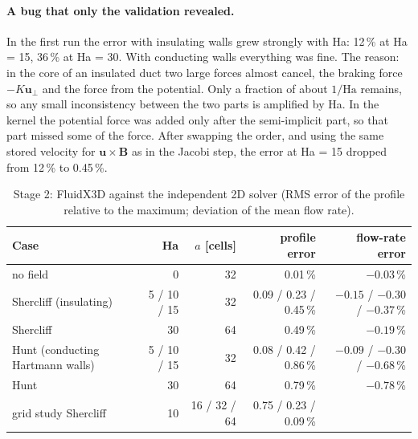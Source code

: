 \paragraph{A bug that only the validation revealed.} In the first run the error with insulating walls grew strongly
with Ha: 12\,\% at Ha = 15, 36\,\% at Ha = 30. With conducting walls everything was fine. The reason: in the core of
an insulated duct two large forces almost cancel, the braking force $-K\mathbf{u}_\perp$ and the force from the
potential. Only a fraction of about $1/\mathrm{Ha}$ remains, so any small inconsistency between the two parts is
amplified by Ha. In the kernel the potential force was added only after the semi-implicit part, so that part missed
some of the force. After swapping the order, and using the same stored velocity for $\mathbf{u}\times\mathbf{B}$ as in
the Jacobi step, the error at Ha = 15 dropped from 12\,\% to 0.45\,\%.

\begin{table}[H]\centering\small
\begin{tabular}{lrrrr}\toprule
Case & Ha & $a$ [cells] & profile error & flow-rate error\\\midrule
no field & 0 & 32 & 0.01\,\% & $-0.03$\,\%\\
Shercliff (insulating) & 5 / 10 / 15 & 32 & 0.09 / 0.23 / 0.45\,\% & $-0.15$ / $-0.30$ / $-0.37$\,\%\\
Shercliff & 30 & 64 & 0.49\,\% & $-0.19$\,\%\\
Hunt (conducting Hartmann walls) & 5 / 10 / 15 & 32 & 0.08 / 0.42 / 0.86\,\% & $-0.09$ / $-0.30$ / $-0.68$\,\%\\
Hunt & 30 & 64 & 0.79\,\% & $-0.78$\,\%\\
grid study Shercliff & 10 & 16 / 32 / 64 & 0.75 / 0.23 / 0.09\,\% & \\\bottomrule
\end{tabular}\caption{Stage 2: FluidX3D against the independent 2D solver (RMS error of the profile relative to the
maximum; deviation of the mean flow rate).}\end{table}

